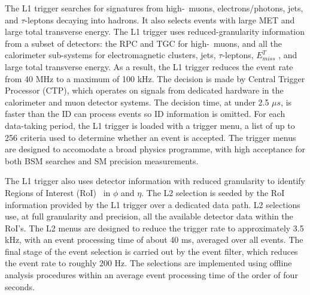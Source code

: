 	The L1 trigger searches for signatures from high-\pt\ muons, electrons/photons, jets, and 
	\mbox{$\tau$-leptons} decaying into hadrons. It also selects events with large MET
	and large total transverse energy. The L1 trigger uses reduced-granularity information from a
	subset of detectors: the RPC and TGC for high-\pt\ muons, and all the calorimeter 
	sub-systems for electromagnetic clusters, jets, $\tau$-leptons, $E_{miss}^T$ ,
	and large total transverse energy.
	As a result, the L1 trigger reduces the event rate from 40 MHz to a maximum of 100 kHz.
	The decision is made by Central Trigger	Processor (CTP), 
	which operates on signals from dedicated hardware in the calorimeter
	and muon detector systems. The decision time, at under 2.5 $\mu s$, is faster than the ID
	can process events so ID information is omitted.
	For each data-taking period, the L1	trigger is loaded with a trigger menu, 
	a list of up to 256 criteria used to determine
	whether an event is accepted. The trigger menus are designed to accomodate a broad
	physics programme, with high acceptance for both BSM searches and SM precision
	measurements.

	The L1 trigger also uses detector information with reduced granularity to identify Regions
	of Interest (RoI)~\cite{Blair:2007qn} in $\phi$ and $\eta$.
	The L2 selection is seeded by the RoI information provided by the L1 trigger over a dedicated
	data path. L2 selections use, at full granularity and precision, all the available detector 
	data within the RoI’s.
	The L2 menus are designed to reduce the
	trigger rate to approximately 3.5 kHz, with an event processing time of about 40 ms,
	averaged over all events. The final stage of the event selection is carried out by 
	the event filter, which reduces the event rate to roughly 200 Hz. 
	The selections are implemented using offline analysis procedures
	within an average event processing time of the order of four seconds.
	


